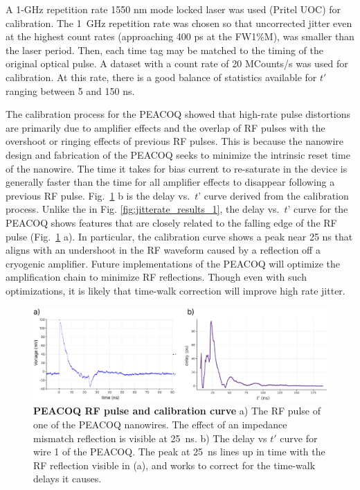 \documentclass[11pt]{caltech_thesis} %
\begin{document}
A 1-GHz repetition rate 1550 nm mode locked laser was used (Pritel UOC) for calibration. The 1~GHz repetition rate was chosen so that uncorrected jitter even at the highest count rates (approaching 400 ps at the FW1\%M), was smaller than the laser period. Then, each time tag may be matched to the timing of the original optical pulse. A dataset with a count rate of 20 MCounts/s was used for calibration. At this rate, there is a good balance of statistics available for $t'$ ranging between 5 and 150 ns.

The calibration process for the PEACOQ showed that high-rate pulse distortions are primarily due to amplifier effects and the overlap of RF pulses with the overshoot or ringing effects of previous RF pulses. This is because the nanowire design and fabrication of the PEACOQ seeks to minimize the intrinsic reset time of the nanowire. The time it takes for bias current to re-saturate in the device is generally faster than the time for all amplifier effects to disappear following a previous RF pulse. Fig.~\ref{fig:order_1st} b is the delay vs.~$t’$ curve derived from the calibration process. Unlike the in Fig. \ref{fig:jitterate_results_1}, the delay vs.~$t’$ curve for the PEACOQ shows features that are closely related to the falling edge of the RF pulse (Fig.~\ref{fig:order_1st} a). In particular, the calibration curve shows a peak near 25 ns that aligns with an undershoot in the RF waveform caused by a reflection off a cryogenic amplifier. Future implementations of the PEACOQ will optimize the amplification chain to minimize RF reflections. Though even with such optimizations, it is likely that time-walk correction will improve high rate jitter.

\hypertarget{fig:order_1st}{%
\begin{figure}
\centering
\includegraphics[width=1\textwidth,height=\textheight]{chapter_02/figs_02/SOM_Figure_order_1st_v2_light.pdf}
\caption[{PEACOQ RF pulse and calibration curve}]{\textbf{PEACOQ RF pulse and calibration curve} a) The RF pulse of one of the PEACOQ nanowires. The effect of an impedance mismatch reflection is visible at 25~ns. b) The delay vs $t'$ curve for wire 1 of the PEACOQ. The peak at 25~ns lines up in time with the RF reflection visible in (a), and works to correct for the time-walk delays it causes.}
\label{fig:order_1st}
\end{figure}
}
\end{document}
